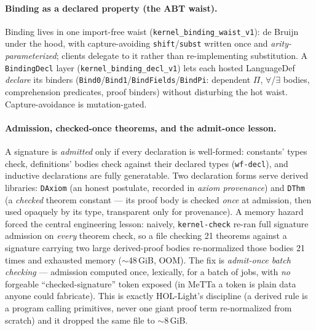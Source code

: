 \documentclass[11pt]{article}
\newcommand{\MeTTa}{MeTTa}
\newcommand{\code}[1]{\texttt{#1}}
\begin{document}
\paragraph{Binding as a declared property (the ABT waist).} Binding lives in one
import-free waist (\code{kernel\_binding\_waist\_v1}): de Bruijn under the hood, with
capture-avoiding \code{shift}/\code{subst} written once and \emph{arity-parameterized};
clients delegate to it rather than re-implementing substitution. A \code{BindingDecl}
layer (\code{kernel\_binding\_decl\_v1}) lets each hosted LanguageDef \emph{declare} its
binders (\code{Bind0}/\code{Bind1}/\code{BindFields}/\code{BindPi}: dependent $\Pi$,
$\forall$/$\exists$ bodies, comprehension predicates, proof binders) without disturbing
the hot waist. Capture-avoidance is mutation-gated.

\paragraph{Admission, checked-once theorems, and the admit-once lesson.} A signature is
\emph{admitted} only if every declaration is well-formed: constants' types check,
definitions' bodies check against their declared types (\code{wf-decl}), and inductive
declarations are fully generatable. Two declaration forms serve derived libraries:
\code{DAxiom} (an honest postulate, recorded in \emph{axiom provenance}) and \code{DThm}
(a \emph{checked} theorem constant --- its proof body is checked \emph{once} at
admission, then used opaquely by its type, transparent only for provenance). A memory
hazard forced the central engineering lesson: naively, \code{kernel-check} re-ran full
signature admission on \emph{every} theorem check, so a file checking 21 theorems
against a signature carrying two large derived-proof bodies re-normalized those bodies
21 times and exhausted memory ($\sim$48\,GiB, OOM). The fix is \emph{admit-once batch
checking} --- admission computed once, lexically, for a batch of jobs, with \emph{no}
forgeable ``checked-signature'' token exposed (in \MeTTa{} a token is plain data anyone
could fabricate). This is exactly HOL-Light's discipline (a derived rule is a program
calling primitives, never one giant proof term re-normalized from scratch) and it
dropped the same file to $\sim$8\,GiB.
\end{document}
